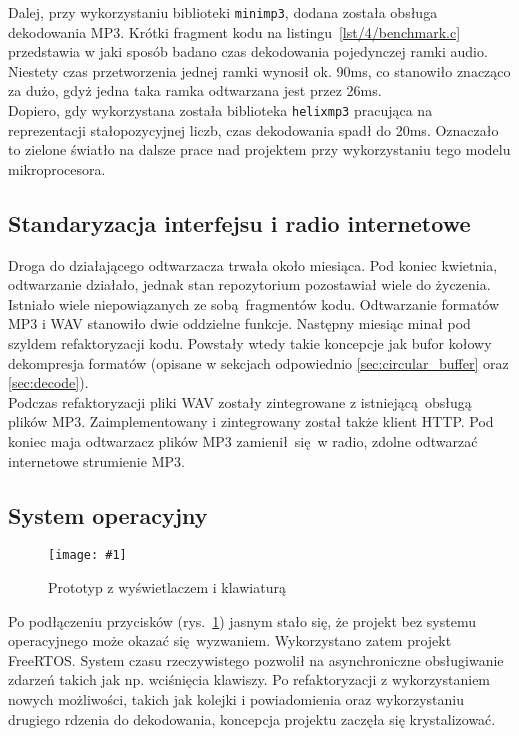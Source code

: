 \documentclass[12pt]{report}
\newcommand{\imgint}[4]{
	\begin{figure}[{#4}]
		\centering
		\texttt{[image: \#1]}
		\caption{#2}
		\label{#1}
	\end{figure}
}
\newcommand{\imgh}[3]{\imgint{#1}{#2}{#3}{H}}
\begin{document}
			Dalej, przy wykorzystaniu biblioteki \lstinline|minimp3|\textsuperscript{\cite{minimp3}}, dodana została obsługa dekodowania MP3. Krótki fragment kodu na listingu~\ref{lst/4/benchmark.c} przedstawia w jaki sposób badano czas dekodowania pojedynczej ramki audio. Niestety czas przetworzenia jednej ramki wynosił ok. 90ms, co stanowiło znacząco za dużo, gdyż jedna taka ramka odtwarzana jest przez 26ms.
			$ $\\
			
			Dopiero, gdy wykorzystana została biblioteka \lstinline|helixmp3| pracująca na reprezentacji stałopozycyjnej liczb, czas dekodowania spadł do 20ms. Oznaczało to zielone światło na dalsze prace nad projektem przy wykorzystaniu tego modelu mikroprocesora.
			
		\subsection{Standaryzacja interfejsu i radio internetowe}
			Droga do działającego odtwarzacza trwała około miesiąca. Pod koniec kwietnia, odtwarzanie działało, jednak stan repozytorium pozostawiał wiele do życzenia. Istniało wiele niepowiązanych ze sobą fragmentów kodu. Odtwarzanie formatów MP3 i WAV stanowiło dwie oddzielne funkcje. Następny miesiąc minał pod szyldem refaktoryzacji kodu. Powstały wtedy takie koncepcje jak bufor kołowy dekompresja formatów (opisane w sekcjach odpowiednio \ref{sec:circular_buffer} oraz \ref{sec:decode}).
			$ $\\
			
			Podczas refaktoryzacji pliki WAV zostały zintegrowane z istniejącą obsługą plików MP3. Zaimplementowany i zintegrowany został także klient HTTP. Pod koniec maja odtwarzacz plików MP3 zamienił się w radio, zdolne odtwarzać internetowe strumienie MP3.
			
		\subsection{System operacyjny}
			\imgh{4/prototype_2}{Prototyp z wyświetlaczem i klawiaturą}{0.8}
		
			Po podłączeniu przycisków (rys.~\ref{4/prototype_2}) jasnym stało się, że projekt bez systemu operacyjnego może okazać się wyzwaniem. Wykorzystano zatem projekt FreeRTOS. System czasu rzeczywistego pozwolił na asynchroniczne obsługiwanie zdarzeń takich jak np. wciśnięcia klawiszy. Po refaktoryzacji z wykorzystaniem nowych możliwości, takich jak kolejki i powiadomienia oraz wykorzystaniu drugiego rdzenia do dekodowania, koncepcja projektu zaczęła się krystalizować.
			
\end{document}
